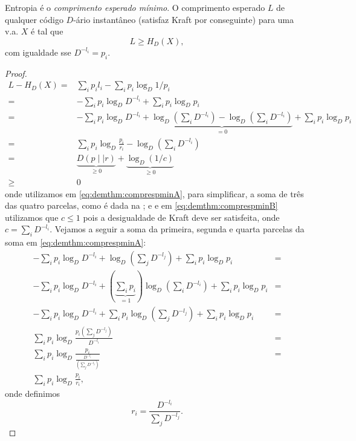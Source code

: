 \begin{theorem}\label{thm:comprespmin}
Entropia é o \emph{comprimento esperado mínimo}. O comprimento esperado $L$ de qualquer código
$D$-ário instantâneo (satisfaz Kraft por conseguinte) para uma v.a. $X$ é tal que
\begin{equation}
  L \geq H_D (X) ,
\end{equation}
com igualdade sse $D^{-l_i} = p_i$.
\end{theorem}
\begin{proof}
  \begin{subequations}
    \begin{align}
      L - H_D (X) ={}& \sum_i p_i l_i - \sum_i p_i \log_D 1/p_i \\
                ={}& - \sum_i p_i \log_D D^{-l_i} + \sum_i p_i \log_D p_i \\
                ={}& - \sum_i p_i \log_D D^{-l_i} + \underbrace{ \log_D \left( \sum_i D^{-l_i} \right) - \log_D \left( \sum_i D^{-l_i} \right)  }_{=0} + \sum_i p_i \log_D p_i \label{eq:demthm:comprespminA}\\
                ={}& \sum_i p_i \log_D \frac{p_i}{r_i} - \log_D \left( \sum_i D^{-l_i} \right) \\
                ={}& \underbrace{D(p \mid\mid r)}_{ \geq 0} + \underbrace{\log_D (1/c)}_{ \geq 0} \\
                \geq{}& 0 \label{eq:demthm:comprespminB}
    \end{align}
  \end{subequations}
  onde utilizamos em \ref{eq:demthm:comprespminA}, para simplificar, a soma de três das quatro parcelas, como é dada na ; e
  e em \ref{eq:demthm:comprespminB} utilizamos que $c \leq 1$ pois a desigualdade de Kraft deve ser satisfeita,
  onde $c = \sum_i D^{-l_i}$.
  Vejamos a seguir a soma da primeira, segunda e quarta parcelas da soma em \ref{eq:demthm:comprespminA}:
  \begin{subequations}\label{eq:demthm:simplificar}
    \begin{align}
      - \sum_i p_i \log_D D^{-l_i} + \log_D \left( \sum_j D^{-l_j} \right) +  \sum_i p_i \log_D p_i &= \\
      - \sum_i p_i \log_D D^{-l_i} + \left( \underbrace{ \sum_i p_i }_{=1} \right) \log_D \left( \sum_i D^{-l_i} \right) + \sum_i p_i \log_D p_i &= \\  
      - \sum_i p_i \log_D D^{-l_i} + \sum_i p_i \log_D \left( \sum_j D^{-l_j} \right) + \sum_i p_i \log_D p_i &= \\
      \sum_i p_i \log_D \frac{p_i \left( \sum_j D^{-l_j} \right)}{D^{-l_i}} &= \\
      \sum_i p_i \log_D \frac{p_i}{\frac{D^{-l_i}}{\left( \sum_j D^{-l_j} \right)}} &= \\
      \sum_i p_i \log_D \frac{p_i}{r_i} ,
    \end{align}
  \end{subequations}
  onde definimos
  \begin{equation}
    r_i = \frac{D^{-l_i}}{\sum_j D^{-l_j}} .
  \end{equation}
\end{proof}

